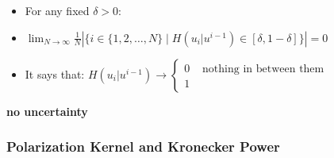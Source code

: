 \documentclass[11pt]{article}
\begin{document}
\begin{itemize}
\item
  For any fixed \(\delta > 0\):
\item
  \(\boxed{\lim_{N \to \infty} \frac{1}{N} \left| \{ i \in \{1, 2, \dots, N\} \mid H(u_i | u^{i-1}) \in [\delta, 1-\delta] \} \right| = 0}\)
\item
  It says that:
  \(H(u_i | u^{i-1}) \to \begin{cases} 0       & \boxed{\text{ nothing in between them}} \\ 1 \end{cases}\)
\end{itemize}

\textbf{no uncertainty}

    \subsubsection{Polarization Kernel and Kronecker
Power}\label{polarization-kernel-and-kronecker-power}
\end{document}
